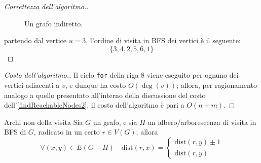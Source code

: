 \documentclass[a4paper, 12pt]{report}
\begin{document}
\begin{proof}[Correttezza dell'algoritmo.]
\begin{figure}[H]
            \caption{Un grafo indiretto.}
        \end{figure}

        partendo dal vertice $u = 3$, l'ordine di visita in BFS dei vertici è il seguente: $$\{3, 4, 2, 5, 6, 1\}$$

    \end{proof}

    \begin{proof}[Costo dell'algoritmo.]
        Il ciclo \texttt{for} della riga $8$ viene eseguito per ognuno dei vertici adiacenti a $v$, e dunque ha costo $O(\deg(v))$; allora, per ragionamento analogo a quello presentato all'interno della discussione del costo dell'\cref{findReachableNodes2}, il costo dell'algoritmo è pari a $O(n +m)$.
    \end{proof}

    \begin{framedobs}{Archi non della visita}
        Sia $G$ un grafo, e sia $H$ un albero/arborescenza di visita in BFS di $G$, radicato in un certo $r \in V(G)$; allora $$\forall (x, y) \in E(G - H) \quad \mathrm{dist}(r, x) = \left \{ \begin{array}{l} \mathrm{dist}(r, y) \pm 1 \\ \mathrm{dist}(r, y) \end{array} \right.$$
    \end{framedobs}
\end{document}
